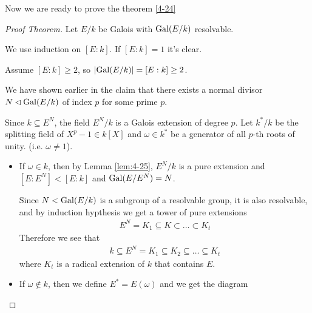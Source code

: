 Now we are ready to prove the theorem \ref{4-24}
\begin{proof}[Proof Theorem]
  Let $E/k$ be Galois with $\operatorname{Gal}(E/k)$ resolvable.

  We use induction on $[E:k]$. If $[E:k] = 1$ it's clear.

  Assume $[E:k] \geq 2$, so $\abs{\Gal(E/k)} = [E:k] \geq 2$.

  We have shown earlier in the claim that there exists a normal divisor $N \lhd \operatorname{Gal}(E/k)$ of index $p$ for some prime $p$.

  Since $k \subseteq E^{N}$, the field $E^{N}/k$ is a Galois extension of degree $p$.
  Let $k^{\ast}/k$ be the splitting field of $X^{p} - 1 \in k[X]$ and $\omega \in k^{\ast}$ be a generator of all $p$-th roots of unity. (i.e. $\omega \neq 1$).
  \begin{itemize}
    \item If $\omega \in k$, then by Lemma \ref{lem:4-25}, $E^{N}/k$ is a pure extension and $[E:E^{N}] < [E:k]$ and $\operatorname{Gal}(E/E^{N}) = N$.
      
      Since $N < \operatorname{Gal}(E/k)$ is a subgroup of a resolvable group, it is also resolvable, and by induction hypthesis we get a tower of pure extensions
      \begin{align*}
        E^{N} = K_1 \subseteq K \subset \ldots \subset K_t
      \end{align*}
      Therefore we see that
      \begin{align*}
        k \subseteq E^{N} = K_1 \subseteq K_2 \subseteq \ldots \subseteq K_t
      \end{align*}
      where $K_t$ is a radical extension of $k$ that contains $E$.

    \item If $\omega \notin k$, then we define $E^{\ast} = E(\omega)$ and we get the diagram
      \begin{center}
      \end{center}
  \end{itemize}
\end{proof}



